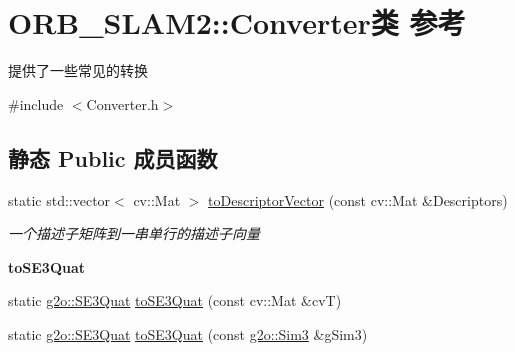 \hypertarget{classORB__SLAM2_1_1Converter}{\section{O\-R\-B\-\_\-\-S\-L\-A\-M2\-:\-:Converter类 参考}
\label{classORB__SLAM2_1_1Converter}
}


提供了一些常见的转换  




{\ttfamily \#include $<$Converter.\-h$>$}

\subsection*{静态 Public 成员函数}
\begin{DoxyCompactItemize}
\item 
\hypertarget{classORB__SLAM2_1_1Converter_abef47701eefdbc74c2c1625c140963fd}{static std\-::vector$<$ cv\-::\-Mat $>$ \hyperlink{classORB__SLAM2_1_1Converter_abef47701eefdbc74c2c1625c140963fd}{to\-Descriptor\-Vector} (const cv\-::\-Mat \&Descriptors)}\label{classORB__SLAM2_1_1Converter_abef47701eefdbc74c2c1625c140963fd}

\begin{DoxyCompactList}\small\item\em 一个描述子矩阵到一串单行的描述子向量 \end{DoxyCompactList}\end{DoxyCompactItemize}
\begin{Indent}{\bf to\-S\-E3\-Quat}\par
\begin{DoxyCompactItemize}
\item 
static \hyperlink{classg2o_1_1SE3Quat}{g2o\-::\-S\-E3\-Quat} \hyperlink{classORB__SLAM2_1_1Converter_a0b73791a3e2d90b4de41aed0ece2d0a2}{to\-S\-E3\-Quat} (const cv\-::\-Mat \&cv\-T)
\item 
static \hyperlink{classg2o_1_1SE3Quat}{g2o\-::\-S\-E3\-Quat} \hyperlink{classORB__SLAM2_1_1Converter_ac76ddd3b4d9a7e364e5cc72cfe483247}{to\-S\-E3\-Quat} (const \hyperlink{structg2o_1_1Sim3}{g2o\-::\-Sim3} \&g\-Sim3)
\end{DoxyCompactItemize}
\end{Indent}
